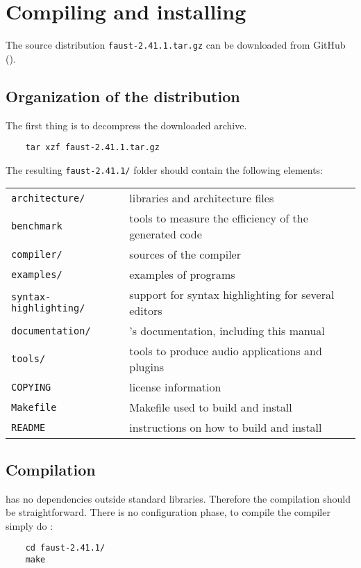 \chapter{Compiling and installing \faust}

The \faust source distribution \lstinline'faust-2.41.1.tar.gz' can be downloaded from GitHub ().

\section{Organization of the distribution}
The first thing is to decompress the downloaded archive. 
\begin{lstlisting}
	tar xzf faust-2.41.1.tar.gz
\end{lstlisting}

The resulting \lstinline'faust-2.41.1/' folder should contain the following elements:

\begin{tabular}{ll}
	\lstinline'architecture/' 		&\faust libraries and architecture files\\
	\lstinline'benchmark'			&tools to measure the efficiency of the generated code\\
	\lstinline'compiler/'			&sources of the \faust compiler\\
	\lstinline'examples/'			&examples of \faust programs\\
	\lstinline'syntax-highlighting/'&	support for syntax highlighting for several editors\\
	\lstinline'documentation/' 		&\faust's documentation, including this manual\\
	\lstinline'tools/'				&tools to produce audio applications and plugins\\
	\lstinline'COPYING'			&license information\\
	\lstinline'Makefile'			&Makefile used to build and install \faust\\
	\lstinline'README'			&instructions on how to build and install \faust
\end{tabular}

\section{Compilation}
\faust has no dependencies outside standard libraries. Therefore the compilation should be straightforward. There is no configuration phase, to compile the \faust compiler simply do :
\begin{lstlisting}
	cd faust-2.41.1/
	make
\end{lstlisting}

